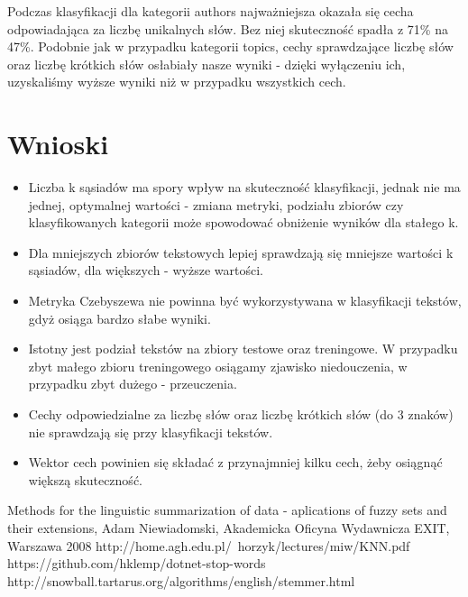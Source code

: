 \documentclass{classrep}
\begin{document}
Podczas klasyfikacji dla kategorii authors najważniejsza okazała się cecha odpowiadająca za liczbę unikalnych słów. Bez niej skuteczność spadła z 71\% na 47\%. Podobnie jak w przypadku kategorii topics, cechy sprawdzające liczbę słów oraz liczbę krótkich słów osłabiały nasze wyniki - dzięki wyłączeniu ich, uzyskaliśmy wyższe wyniki niż w przypadku wszystkich cech. 

	
\section{Wnioski}
\begin{itemize}
	\item Liczba k sąsiadów ma spory wpływ na skuteczność klasyfikacji, jednak nie ma jednej, optymalnej wartości - zmiana metryki, podziału zbiorów czy klasyfikowanych kategorii może spowodować obniżenie wyników dla stałego k.
	\item Dla mniejszych zbiorów tekstowych lepiej sprawdzają się mniejsze wartości k sąsiadów, dla większych - wyższe wartości.
	\item Metryka Czebyszewa nie powinna być wykorzystywana w klasyfikacji tekstów, gdyż osiąga bardzo słabe wyniki.
	\item Istotny jest podział tekstów na zbiory testowe oraz treningowe. W przypadku zbyt małego zbioru treningowego osiągamy zjawisko niedouczenia, w przypadku zbyt dużego - przeuczenia.
	\item Cechy odpowiedzialne za liczbę słów oraz liczbę krótkich słów (do 3 znaków)  nie sprawdzają się przy klasyfikacji tekstów.
	\item Wektor cech powinien się składać z przynajmniej kilku cech, żeby osiągnąć większą skuteczność.
\end{itemize}

	

\begin{thebibliography}{}
Methods for the linguistic summarization of data - aplications of fuzzy sets and their extensions, Adam Niewiadomski, Akademicka Oficyna Wydawnicza EXIT, Warszawa 2008
http://home.agh.edu.pl/~horzyk/lectures/miw/KNN.pdf
https://github.com/hklemp/dotnet-stop-words
http://snowball.tartarus.org/algorithms/english/stemmer.html
\end{thebibliography}
\end{document}
